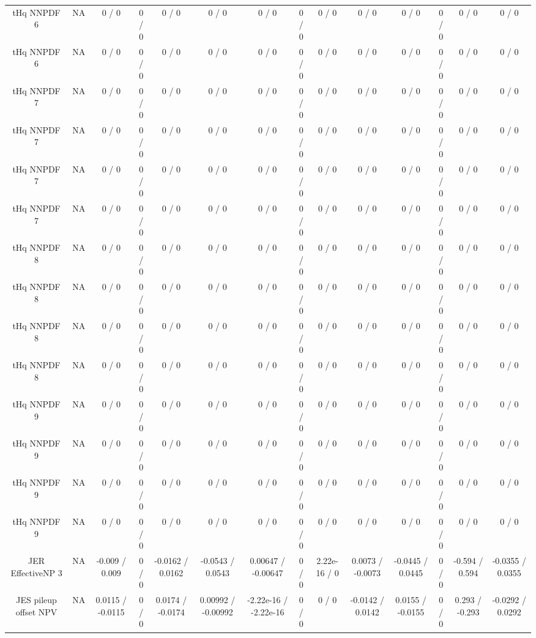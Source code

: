 \documentclass[10pt]{article}
\begin{document}
\begin{table}[htbp]
\begin{center}
\begin{tabular}{|c|c|c|c|c|c|c|c|c|c|c|c|c|c|}
  tHq NNPDF 6 &    NA    & 0 / 0 & 0 / 0 & 0 / 0 & 0 / 0 & 0 / 0 & 0 / 0 & 0 / 0 & 0 / 0 & 0 / 0 & 0 / 0 & 0 / 0 & 0 / 0 \\ 
  tHq NNPDF 6 &    NA    & 0 / 0 & 0 / 0 & 0 / 0 & 0 / 0 & 0 / 0 & 0 / 0 & 0 / 0 & 0 / 0 & 0 / 0 & 0 / 0 & 0 / 0 & 0 / 0 \\ 
  tHq NNPDF 7 &    NA    & 0 / 0 & 0 / 0 & 0 / 0 & 0 / 0 & 0 / 0 & 0 / 0 & 0 / 0 & 0 / 0 & 0 / 0 & 0 / 0 & 0 / 0 & 0 / 0 \\ 
  tHq NNPDF 7 &    NA    & 0 / 0 & 0 / 0 & 0 / 0 & 0 / 0 & 0 / 0 & 0 / 0 & 0 / 0 & 0 / 0 & 0 / 0 & 0 / 0 & 0 / 0 & 0 / 0 \\ 
  tHq NNPDF 7 &    NA    & 0 / 0 & 0 / 0 & 0 / 0 & 0 / 0 & 0 / 0 & 0 / 0 & 0 / 0 & 0 / 0 & 0 / 0 & 0 / 0 & 0 / 0 & 0 / 0 \\ 
  tHq NNPDF 7 &    NA    & 0 / 0 & 0 / 0 & 0 / 0 & 0 / 0 & 0 / 0 & 0 / 0 & 0 / 0 & 0 / 0 & 0 / 0 & 0 / 0 & 0 / 0 & 0 / 0 \\ 
  tHq NNPDF 8 &    NA    & 0 / 0 & 0 / 0 & 0 / 0 & 0 / 0 & 0 / 0 & 0 / 0 & 0 / 0 & 0 / 0 & 0 / 0 & 0 / 0 & 0 / 0 & 0 / 0 \\ 
  tHq NNPDF 8 &    NA    & 0 / 0 & 0 / 0 & 0 / 0 & 0 / 0 & 0 / 0 & 0 / 0 & 0 / 0 & 0 / 0 & 0 / 0 & 0 / 0 & 0 / 0 & 0 / 0 \\ 
  tHq NNPDF 8 &    NA    & 0 / 0 & 0 / 0 & 0 / 0 & 0 / 0 & 0 / 0 & 0 / 0 & 0 / 0 & 0 / 0 & 0 / 0 & 0 / 0 & 0 / 0 & 0 / 0 \\ 
  tHq NNPDF 8 &    NA    & 0 / 0 & 0 / 0 & 0 / 0 & 0 / 0 & 0 / 0 & 0 / 0 & 0 / 0 & 0 / 0 & 0 / 0 & 0 / 0 & 0 / 0 & 0 / 0 \\ 
  tHq NNPDF 9 &    NA    & 0 / 0 & 0 / 0 & 0 / 0 & 0 / 0 & 0 / 0 & 0 / 0 & 0 / 0 & 0 / 0 & 0 / 0 & 0 / 0 & 0 / 0 & 0 / 0 \\ 
  tHq NNPDF 9 &    NA    & 0 / 0 & 0 / 0 & 0 / 0 & 0 / 0 & 0 / 0 & 0 / 0 & 0 / 0 & 0 / 0 & 0 / 0 & 0 / 0 & 0 / 0 & 0 / 0 \\ 
  tHq NNPDF 9 &    NA    & 0 / 0 & 0 / 0 & 0 / 0 & 0 / 0 & 0 / 0 & 0 / 0 & 0 / 0 & 0 / 0 & 0 / 0 & 0 / 0 & 0 / 0 & 0 / 0 \\ 
  tHq NNPDF 9 &    NA    & 0 / 0 & 0 / 0 & 0 / 0 & 0 / 0 & 0 / 0 & 0 / 0 & 0 / 0 & 0 / 0 & 0 / 0 & 0 / 0 & 0 / 0 & 0 / 0 \\ 
  JER EffectiveNP 3 &    NA    & -0.009 / 0.009 & 0 / 0 & -0.0162 / 0.0162 & -0.0543 / 0.0543 & 0.00647 / -0.00647 & 0 / 0 & 2.22e-16 / 0 & 0.0073 / -0.0073 & -0.0445 / 0.0445 & 0 / 0 & -0.594 / 0.594 & -0.0355 / 0.0355 \\ 
  JES pileup offset NPV &    NA    & 0.0115 / -0.0115 & 0 / 0 & 0.0174 / -0.0174 & 0.00992 / -0.00992 & -2.22e-16 / -2.22e-16 & 0 / 0 & 0 / 0 & -0.0142 / 0.0142 & 0.0155 / -0.0155 & 0 / 0 & 0.293 / -0.293 & -0.0292 / 0.0292 \\ 

\end{tabular}
\end{center}
\end{table}
\end{document}
